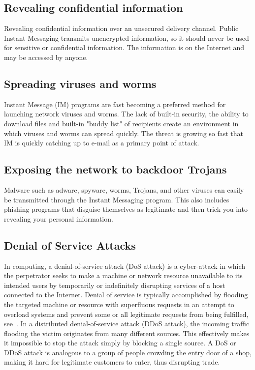 \subsection{Revealing confidential information}\label{subsec:revealing-confidential-information}
Revealing confidential information over an unsecured delivery channel.
Public Instant Messaging transmits unencrypted information, so it should never be used for sensitive or confidential
information.
The information is on the Internet and may be accessed by anyone.

\subsection{Spreading viruses and worms}\label{subsec:spreading-viruses-and-worms}
Instant Message (IM) programs are fast becoming a preferred method for launching network viruses and worms.
The lack of built-in security, the ability to download files and built-in "buddy list" of recipients create an
environment in which viruses and worms can spread quickly.
The threat is growing so fast that IM is quickly catching up to e-mail as a primary point of attack.

\subsection{Exposing the network to backdoor Trojans}\label{subsec:exposing-the-network-to-backdoor-trojans}
Malware such as adware, spyware, worms, Trojans, and other viruses can easily be transmitted through the Instant Messaging program.
This also includes phishing programs that disguise themselves as legitimate and then trick you into revealing your personal information.

\subsection{Denial of Service Attacks}\label{subsec:denial-of-service-attacks}
In computing, a denial-of-service attack (DoS attack) is a cyber-attack in which the perpetrator seeks to make a machine or
network resource unavailable to its intended users by temporarily or indefinitely disrupting services of a host connected
to the Internet.
Denial of service is typically accomplished by flooding the targeted machine or resource with superfluous requests in
an attempt to overload systems and prevent some or all legitimate requests from being fulfilled, see~\cite{gu2007denial}.
In a distributed denial-of-service attack (DDoS attack), the incoming traffic flooding the victim originates from
many different sources.
This effectively makes it impossible to stop the attack simply by blocking a single source.
A DoS or DDoS attack is analogous to a group of people crowding the entry door of a shop, making it hard for legitimate
customers to enter, thus disrupting trade.

